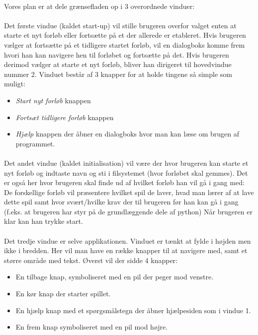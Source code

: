 \documentclass[10pt,a4paper,danish]{article}
\begin{document}
\paragraph{}
Vores plan er at dele grænsefladen op i 3 overordnede vinduer:

\paragraph{}
Det første vindue (kaldet start-up) vil stille brugeren overfor valget enten at starte et 
nyt forløb eller fortsætte på et der allerede er etableret.
Hvis brugeren vælger at fortsætte på et tidligere startet forløb, vil en dialogboks komme 
frem hvori han kan navigere hen til forløbet og fortsætte på det.
Hvis brugeren derimod vælger at starte et nyt forløb, bliver han dirigeret til hovedvindue
nummer 2. Vinduet består af 3 knapper for at holde tingene så simple som muligt: 
\begin{itemize}
\item \textit{Start nyt forløb} knappen
\item \textit{Fortsæt tidligere forløb} knappen
\item \textit{Hjælp} knappen der åbner en dialogboks hvor man kan læse om brugen af programmet.
\end{itemize}

\paragraph{}
Det andet vindue (kaldet initialisation) vil være der hvor brugeren kan starte et nyt forløb og
indtaste navn og sti i filsystemet (hvor forløbet skal gemmes).
Det er også her hvor brugeren skal finde ud af hvilket forløb han vil gå i gang med: De forskellige
forløb vil præsentere hvilket spil de laver, hvad man lærer af at lave dette spil samt hvor svært/hvilke
 krav der til brugeren før han kan gå i gang (f.eks. at brugeren har styr på de grundlæggende dele af python)
Når brugeren er klar kan han trykke start.

\paragraph{}
Det tredje vindue er selve applikationen.
Vinduet er tænkt at fylde i højden men ikke i bredden.
Her vil man have en række knapper til at navigere med, samt et større område med tekst.
Øverst vil der sidde 4 knapper: 
\begin{itemize}
  \item En tilbage knap, symboliseret med en pil der peger mod venstre.
  \item En kør knap der starter spillet.
  \item En hjælp knap med et spørgsmålstegn der åbner hjælpesiden som i vindue 1.
  \item En frem knap symboliseret med en pil mod højre.
\end{itemize}
\end{document}
